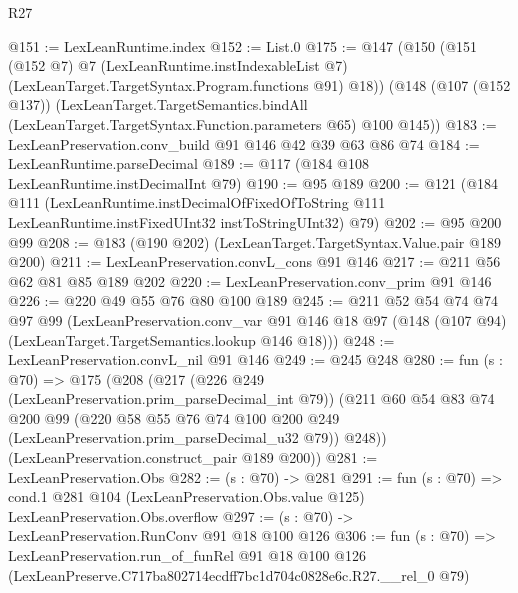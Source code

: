 \begin{lexlean}{R27}
\begin{coremodule}
@151 := LexLeanRuntime.index
@152 := List.{0}
@175 := @147
    (@150
      (@151
        (@152 @7)
        @7
        (LexLeanRuntime.instIndexableList @7)
        (LexLeanTarget.TargetSyntax.Program.functions @91)
        @18))
    (@148
      (@107 (@152 @137))
      (LexLeanTarget.TargetSemantics.bindAll
        (LexLeanTarget.TargetSyntax.Function.parameters @65)
        @100
        @145))
@183 := LexLeanPreservation.conv_build @91 @146 @42 @39 @63 @86 @74
@184 := LexLeanRuntime.parseDecimal
@189 := @117 (@184 @108 LexLeanRuntime.instDecimalInt @79)
@190 := @95 @189
@200 := @121
    (@184
      @111
      (LexLeanRuntime.instDecimalOfFixedOfToString
        @111
        LexLeanRuntime.instFixedUInt32
        instToStringUInt32)
      @79)
@202 := @95 @200 @99
@208 := @183 (@190 @202) (LexLeanTarget.TargetSyntax.Value.pair @189 @200)
@211 := LexLeanPreservation.convL_cons @91 @146
@217 := @211 @56 @62 @81 @85 @189 @202
@220 := LexLeanPreservation.conv_prim @91 @146
@226 := @220 @49 @55 @76 @80 @100 @189
@245 := @211
    @52
    @54
    @74
    @74
    @97
    @99
    (LexLeanPreservation.conv_var
      @91
      @146
      @18
      @97
      (@148 (@107 @94) (LexLeanTarget.TargetSemantics.lookup @146 @18)))
@248 := LexLeanPreservation.convL_nil @91 @146
@249 := @245 @248
@280 := fun (s : @70) =>
  @175
    (@208
      (@217
        (@226 @249 (LexLeanPreservation.prim_parseDecimal_int @79))
        (@211
          @60
          @54
          @83
          @74
          @200
          @99
          (@220 @58 @55 @76 @74 @100 @200 @249 (LexLeanPreservation.prim_parseDecimal_u32 @79))
          @248))
      (LexLeanPreservation.construct_pair @189 @200))
@281 := LexLeanPreservation.Obs
@282 := (s : @70) -> @281
@291 := fun (s : @70) =>
  cond.{1} @281 @104 (LexLeanPreservation.Obs.value @125) LexLeanPreservation.Obs.overflow
@297 := (s : @70) -> LexLeanPreservation.RunConv @91 @18 @100 @126
@306 := fun (s : @70) =>
  LexLeanPreservation.run_of_funRel
    @91
    @18
    @100
    @126
    (LexLeanPreserve.C717ba802714ecdff7bc1d704c0828e6c.R27.__rel_0 @79)
\end{coremodule}
\end{lexlean}
